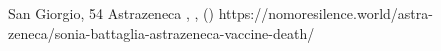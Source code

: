           {San Giorgio, }
          {54}
          {Astrazeneca}
          {}
          {
            ,
            ,
             ()
          }
          {https://nomoresilence.world/astra-zeneca/sonia-battaglia-astrazeneca-vaccine-death/}
